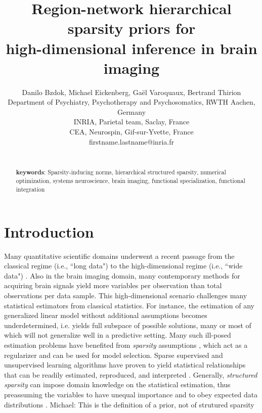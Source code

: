 \documentclass{article} %
\title{Region-network hierarchical sparsity priors for\\
high-dimensional inference in brain imaging}
\begin{document}
\author{Danilo Bzdok, Michael Eickenberg,
  Ga\"el Varoquaux, Bertrand Thirion\\
  Department of Psychiatry, Psychotherapy and Psychosomatics, RWTH Aachen, Germany\\
  INRIA, Parietal team, Saclay, France\\
  CEA, Neurospin, Gif-sur-Yvette, France\\
  firstname.lastname@inria.fr}

\maketitle

\begin{abstract}


\textbf{\\keywords}:
Sparsity-inducing norms, hierarchical structured sparsity,
numerical optimization,
systems neuroscience, brain imaging,
functional specialization, functional integration

\end{abstract}



\section{Introduction}
Many quantitative scientific domains underwent a
recent passage from the classical regime (i.e., ``long data")  to
the high-dimensional regime (i.e., ``wide data")
\cite{jordan2015massive}.
Also in the brain imaging domain,
many contemporary methods for acquiring brain signals yield
more variables per observation than
total observations per data sample.
This high-dimensional scenario challenges many statistical estimators from
classical statistics.
For instance,
the estimation of any generalized linear model without additional assumptions
becomes underdetermined, i.e. yields full subspace of possible solutions, many or most of which will not generalize well in a predictive setting.
%
Many such ill-posed estimation problems
have benefited from
\textit{sparsity} assumptions
\cite{buhlmann2011statistics, hastie2015statistical}, which act as a 
regularizer and can be used for model selection.
Sparse supervised and unsupervised
learning algorithms have proven to yield
statistical relationships that can be readily
estimated, reproduced, and interpreted
\cite{giraud2014introduction}.
%
Generally, \textit{structured sparsity} can impose
domain knowledge on the 
statistical estimation,
thus preassuming the variables to have unequal importance
and to obey expected data distributions
\cite{bach2012optimization}.
{\color{red}Michael: This is the definition of a prior, not of strutured sparsity}
\end{document}

